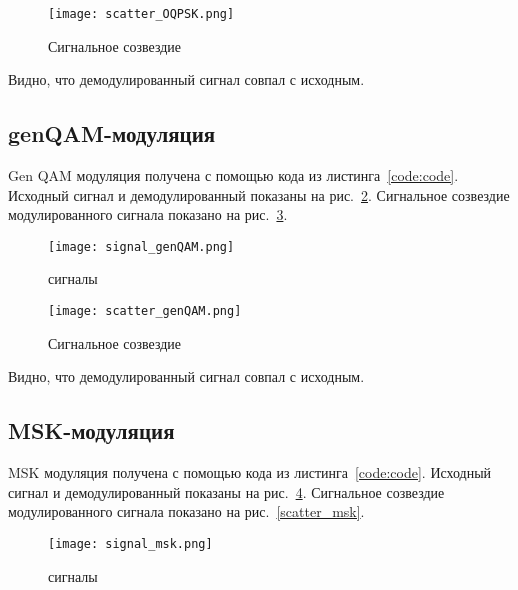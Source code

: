 \begin{figure}[H]
	\begin{center}
		\texttt{[image: scatter\_OQPSK.png]}
		\caption{Сигнальное созвездие} %
		\label{scatter_OQPSK} %
	\end{center}
\end{figure}

Видно, что демодулированный сигнал совпал с исходным.

\subsection{genQAM-модуляция}

Gen QAM модуляция получена с помощью кода из листинга~\ref{code:code}. 
Исходный сигнал и демодулированный показаны на рис.~\ref{signal_genQAM}. Сигнальное созвездие
модулированного сигнала показано на рис.~\ref{scatter_genQAM}.
\begin{figure}[H]
	\begin{center}
		\texttt{[image: signal\_genQAM.png]}
		\caption{сигналы} %
		\label{signal_genQAM} %
	\end{center}
\end{figure}

\begin{figure}[H]
	\begin{center}
		\texttt{[image: scatter\_genQAM.png]}
		\caption{Сигнальное созвездие} %
		\label{scatter_genQAM} %
	\end{center}
\end{figure}

Видно, что демодулированный сигнал совпал с исходным.

\subsection{MSK-модуляция}

MSK модуляция получена с помощью кода из листинга~\ref{code:code}. 
Исходный сигнал и демодулированный показаны на рис.~\ref{signal_msk}. Сигнальное созвездие
модулированного сигнала показано на рис.~\ref{scatter_msk}.
\begin{figure}[H]
	\begin{center}
		\texttt{[image: signal\_msk.png]}
		\caption{сигналы} %
		\label{signal_msk} %
	\end{center}
\end{figure}

